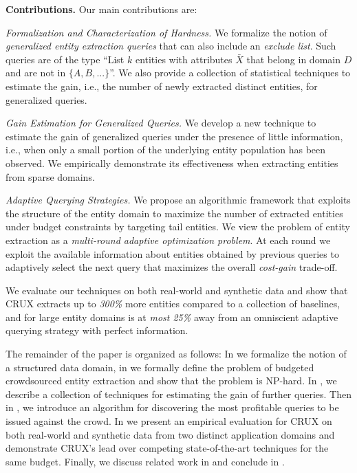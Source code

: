 \noindent
{\bf Contributions.} Our main contributions are:
\squishlist
\item {\em Formalization and Characterization of Hardness.} We formalize the notion of {\em generalized entity extraction queries} that can also include an {\em exclude list}. Such queries are of the type ``List $k$ entities with attributes $\bar{X}$ that belong in domain $D$ and are not in $\{A, B, ...\}$''.  We also provide a collection of statistical techniques to estimate the gain, i.e., the number of newly extracted distinct entities, for generalized queries. 
\item {\em Gain Estimation for Generalized Queries.}  We develop a new technique to estimate the gain of generalized queries under the presence of little information, i.e., when only a small portion of the underlying entity population has been observed. We empirically demonstrate its effectiveness when extracting entities from sparse domains.
\item {\em Adaptive Querying Strategies.} We propose an algorithmic framework that exploits the structure of the entity domain to maximize the number of extracted entities under budget constraints by targeting tail entities. We view the problem of entity extraction as a {\em multi-round adaptive optimization problem}. At  each round we exploit the available information about entities obtained by previous queries to adaptively select the next query that maximizes the overall {\em cost-gain} trade-off.
\squishend

We evaluate our techniques on both real-world and synthetic data and show that CRUX extracts up to {\em 300\%} more entities compared to a collection of baselines, and for large entity domains is at {\em most 25\%} away from an omniscient adaptive querying strategy with perfect information.

The remainder of the paper is organized as follows: In  we formalize the notion of a structured data domain, in  we formally define the problem of budgeted crowdsourced entity extraction and show that the problem is NP-hard. In , we describe a collection of techniques for estimating the gain of further queries. Then in , we introduce an algorithm for discovering the most profitable queries to be issued against the crowd. In  we present an empirical evaluation for CRUX on both real-world and synthetic data from two distinct application domains and demonstrate CRUX's lead over competing state-of-the-art techniques for the same budget. Finally, we discuss related work in  and conclude in .